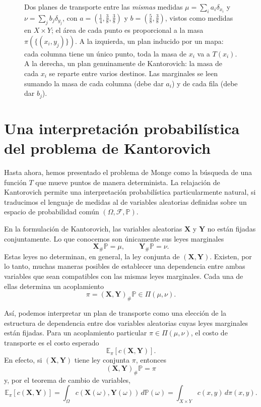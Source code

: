 \documentclass[12pt, a4paper]{amsbook}
\newcommand{\figpanelsep}{6cm}   %
\theoremstyle{remark}
\theoremstyle{definition}
\numberwithin{section}{chapter}
\numberwithin{subsection}{section}
\numberwithin{equation}{section}
\numberwithin{figure}{chapter}
\begin{document}
\begin{figure}[ht]
\caption{Dos planes de transporte entre las \emph{mismas} medidas
$\mu=\sum_i a_i\delta_{x_i}$ y $\nu=\sum_j b_j\delta_{y_j}$, con
$a=(\frac14,\frac38,\frac38)$ y $b=(\frac58,\frac38)$, vistos como medidas en
$X\times Y$; el área de cada punto es proporcional a la masa
$\pi(\{(x_i,y_j)\})$. A la izquierda, un
plan inducido por un mapa: cada columna tiene un único punto, toda la masa de
$x_i$ va a $T(x_i)$. A la derecha, un plan genuinamente de Kantorovich: la masa
de cada $x_i$ se reparte entre varios destinos. Las marginales se leen sumando
la masa de cada columna (debe dar $a_i$) y de cada fila (debe dar $b_j$).}
\label{fig.planes}
\end{figure}
 


\section{Una interpretación probabilística del problema de Kantorovich}\label{sec.interp.prob}

Hasta ahora, hemos presentado el problema de Monge como la búsqueda de
una función $T$ que mueve puntos de manera determinista. La relajación de
Kantorovich permite una interpretación probabilística particularmente
natural, si traducimos el lenguaje de medidas al de variables
aleatorias definidas sobre un espacio de probabilidad común
$(\Omega,\mathcal F,\mathbb P)$.

En la formulación de Kantorovich, las variables aleatorias $\mathbf X$ y
$\mathbf Y$ no están fijadas conjuntamente. Lo que conocemos son
únicamente sus leyes marginales
\[
\mathbf X_\#\mathbb P=\mu,
\qquad
\mathbf Y_\#\mathbb P=\nu.
\]
Estas leyes no determinan, en general, la ley conjunta de
$(\mathbf X,\mathbf Y)$. Existen, por lo tanto, muchas maneras posibles
de establecer una dependencia entre ambas variables que sean
compatibles con las mismas leyes marginales. Cada una de ellas
determina un acoplamiento
\[
\pi=(\mathbf X,\mathbf Y)_\#\mathbb P\in\Pi(\mu,\nu).
\]

Así, podemos interpretar un plan de transporte como una elección de la
estructura de dependencia entre dos variables aleatorias cuyas leyes
marginales están fijadas. Para un acoplamiento particular
$\pi\in\Pi(\mu,\nu)$, el costo de transporte es el costo esperado
\[
\mathbb E_{\pi}[c(\mathbf X,\mathbf Y)].
\]
En efecto, si $(\mathbf X,\mathbf Y)$ tiene ley conjunta $\pi$, entonces
\[
(\mathbf X,\mathbf Y)_\#\mathbb P=\pi
\]
y, por el teorema de cambio de variables,
\[
\mathbb E_{\pi}[c(\mathbf X,\mathbf Y)]
=
\int_\Omega
c(\mathbf X(\omega),\mathbf Y(\omega))\,d\mathbb P(\omega)
=
\int_{X\times Y}c(x,y)\,d\pi(x,y).
\]
\end{document}
